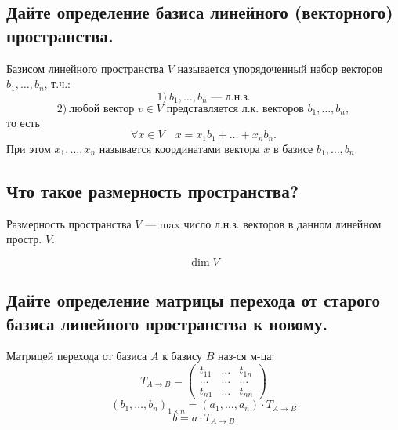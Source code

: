 \subsection{Дайте определение базиса линейного (векторного) пространства.}

\begin{definition}
    Базисом линейного пространства $V$ называется упорядоченный набор векторов $b_1, \ldots, b_n$, т.ч.:
    \[
        1)\ b_1, \ldots, b_n \text{ --- л.н.з.}
    \]
    \[
        2)\ \text{любой вектор } v \in V \text{ представляется л.к. векторов } b_1, \ldots, b_n,
    \]
    то есть
    \[
        \forall x \in V\quad x = x_1 b_1 + \ldots + x_n b_n.
    \]
    При этом $x_1, \ldots, x_n$ называется координатами вектора $x$ в базисе $b_1, \ldots, b_n$.
\end{definition}


\subsection{Что такое размерность пространства?}

\begin{definition}
    Размерность пространства $V$ --- max число л.н.з. векторов в данном линейном простр. $V$.
\end{definition}

\begin{remark}[Обозначение]
    \[
        \dim V
    \]
\end{remark}


\subsection{Дайте определение матрицы перехода от старого базиса линейного пространства к новому.}

\begin{definition}
    Матрицей перехода от базиса $A$ к базису $B$ наз-ся м-ца:
    \[
        T_{A \to B} =
        \begin{pmatrix}
            t_{11} & \ldots & t_{1n} \\
            \ldots & \ldots & \ldots \\
            t_{n1} & \ldots & t_{nn}
        \end{pmatrix}
    \]
    \[
        (b_1, \ldots, b_n)_{1 \times n} = (a_1, \ldots, a_n) \cdot T_{A \to B}
    \]
    \[
        b = a \cdot T_{A \to B}
    \]
\end{definition}

